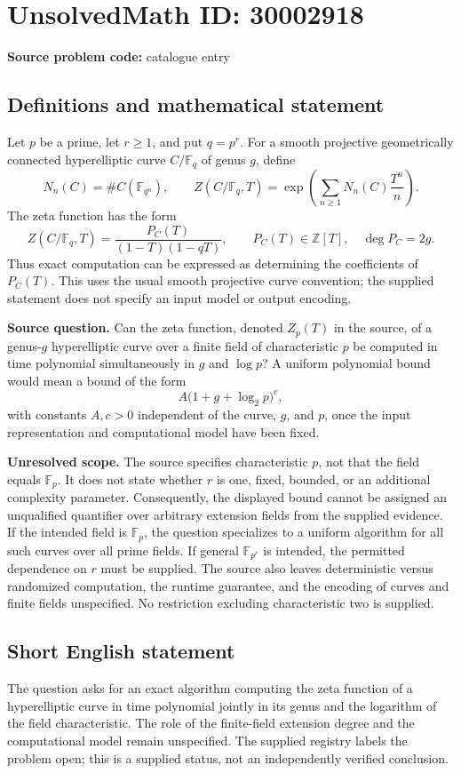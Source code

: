 \documentclass[11pt]{article}
\newcommand{\Z}{\mathbb{Z}}
\newcommand{\F}{\mathbb{F}}
\begin{document}
\section*{UnsolvedMath ID: 30002918}
\textbf{Source problem code:} catalogue entry
\subsection{Definitions and mathematical statement}
Let \(p\) be a prime, let \(r\geq 1\), and put \(q=p^r\). For a smooth projective geometrically connected hyperelliptic curve \(C/\F_q\) of genus \(g\), define
\[
N_n(C)=\#C(\F_{q^n}),\qquad
Z(C/\F_q,T)=\exp\!\left(\sum_{n\geq 1}N_n(C)\frac{T^n}{n}\right).
\]
The zeta function has the form
\[
Z(C/\F_q,T)=\frac{P_C(T)}{(1-T)(1-qT)},\qquad P_C(T)\in\Z[T],\quad \deg P_C=2g.
\]
Thus exact computation can be expressed as determining the coefficients of \(P_C(T)\). This uses the usual smooth projective curve convention; the supplied statement does not specify an input model or output encoding.

\textbf{Source question.} Can the zeta function, denoted \(Z_p(T)\) in the source, of a genus-\(g\) hyperelliptic curve over a finite field of characteristic \(p\) be computed in time polynomial simultaneously in \(g\) and \(\log p\)? A uniform polynomial bound would mean a bound of the form
\[
A\bigl(1+g+\log_2 p\bigr)^c,
\]
with constants \(A,c>0\) independent of the curve, \(g\), and \(p\), once the input representation and computational model have been fixed.

\textbf{Unresolved scope.} The source specifies characteristic \(p\), not that the field equals \(\F_p\). It does not state whether \(r\) is one, fixed, bounded, or an additional complexity parameter. Consequently, the displayed bound cannot be assigned an unqualified quantifier over arbitrary extension fields from the supplied evidence. If the intended field is \(\F_p\), the question specializes to a uniform algorithm for all such curves over all prime fields. If general \(\F_{p^r}\) is intended, the permitted dependence on \(r\) must be supplied. The source also leaves deterministic versus randomized computation, the runtime guarantee, and the encoding of curves and finite fields unspecified. No restriction excluding characteristic two is supplied.
\subsection{Short English statement}
The question asks for an exact algorithm computing the zeta function of a hyperelliptic curve in time polynomial jointly in its genus and the logarithm of the field characteristic. The role of the finite-field extension degree and the computational model remain unspecified. The supplied registry labels the problem open; this is a supplied status, not an independently verified conclusion.
\end{document}
